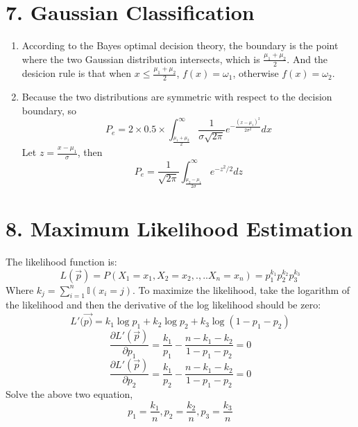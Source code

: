 \documentclass[11pt]{article}
\newenvironment{qparts}{\begin{enumerate}[{(}a{)}]}{\end{enumerate}}
\begin{document}
\newpage
\section*{7. Gaussian Classification}
\begin{qparts}
\item
According to the Bayes optimal decision theory, the boundary is the point where the two Gaussian distribution intersects, which is $\frac{\mu_1 + \mu_2}{2}$. And the desicion rule is that when $x \leq \frac{\mu_1 + \mu_2}{2}$, $f(x)=\omega_1$, otherwise $f(x)=\omega_2$.

\item
Because the two distributions are symmetric with respect to the decision boundary, so 
$$P_e = 2 \times 0.5 \times \int_{\frac{\mu_1+\mu_2}{2}}^\infty \frac{1}{\sigma\sqrt{2\pi}}e^{-\frac{(x-\mu_1)^2}{2\sigma^2}} dx$$
Let $z=\frac{x-\mu_1}{\sigma}$, then
$$P_e = \frac{1}{\sqrt{2\pi}} \int_{\frac{\mu_2-\mu_1}{2\sigma}}^\infty e^{-z^2/2}dz$$

\end{qparts}


\newpage
\section*{8. Maximum Likelihood Estimation}
The likelihood function is:
$$L(\vec{p}) = P(X_1=x_1, X_2=x_2, .,..X_n=x_n) = p_1^{k_1}p_2^{k_2}p_3^{k_3}$$
Where $k_j = \sum_{i=1}^n \mathbb{I}(x_i=j)$.
To maximize the likelihood, take the logarithm of the likelihood and then the derivative of the log likelihood should be zero:
$$L'(\vec{p)} = k_1\log p_1 +k_2\log p_2+k_3\log (1-p_1-p_2)$$
$$\frac{\partial L'(\vec{p})}{\partial p_1} = \frac{k_1}{p_1} - \frac{n-k_1-k_2}{1-p_1-p_2}=0$$
$$\frac{\partial L'(\vec{p})}{\partial p_2} = \frac{k_1}{p_2} - \frac{n-k_1-k_2}{1-p_1-p_2}=0$$
Solve the above two equation, 
$$p_1=\frac{k_1}{n}, p_2=\frac{k_2}{n}, p_3=\frac{k_3}{n}$$
\end{document}

